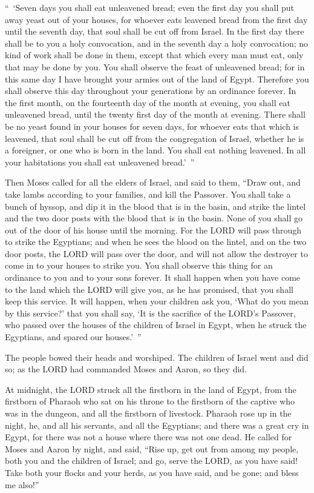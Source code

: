 \myverse{}“ ‘Seven days you shall eat unleavened bread; even the first
day you shall put away yeast out of your houses, for whoever eats leavened bread from the first day until
the seventh day, that soul shall be cut off from Israel.
\myverse{}In the first day there shall be to you a holy convocation, and in the seventh
day a holy convocation; no kind of work shall be done in them, except that which every man must eat, only
that may be done by you.
\myverse{}You shall observe the feast of unleavened bread; for in this same day I have
brought your armies out of the land of Egypt. Therefore you shall observe this day throughout your generations
by an ordinance forever.
\myverse{}In the first month, on the fourteenth day of the month at evening, you shall
eat unleavened bread, until the twenty first day of the month at evening.
\myverse{}There shall be no yeast found in your houses for seven days, for whoever
eats that which is leavened, that soul shall be cut off from the congregation of Israel, whether he is
a foreigner, or one who is born in the land.
\myverse{}You shall eat nothing leavened. In all your habitations you shall eat unleavened
bread.’ ”


\myverse{}Then Moses called for all the elders of Israel, and said to
them, “Draw out, and take lambs according to your families, and kill the Passover.
\myverse{}You shall take a bunch of hyssop, and dip it in the blood that is in the
basin, and strike the lintel and the two door posts with the blood that is in the basin. None of you shall
go out of the door of his house until the morning.
\myverse{}For the LORD will pass through to strike the Egyptians; and when he sees
the blood on the lintel, and on the two door posts, the LORD will pass over the door, and will not allow
the destroyer to come in to your houses to strike you.
\myverse{}You shall observe this thing for an ordinance to you and to your sons forever.
\myverse{}It shall happen when you have come to the land which the LORD will give you,
as he has promised, that you shall keep this service.
\myverse{}It will happen, when your children ask you, ‘What do you mean by this service?’
\myverse{}that you shall say, ‘It is the sacrifice of the LORD’s Passover, who passed
over the houses of the children of Israel in Egypt, when he struck the Egyptians, and spared our houses.’ ”

The people bowed their heads and worshiped. \myverse{}The children of Israel went and did so; as the LORD had commanded Moses and
Aaron, so they did.


\myverse{}At midnight, the LORD struck all the firstborn in the land of
Egypt, from the firstborn of Pharaoh who sat on his throne to the firstborn of the captive who was in
the dungeon, and all the firstborn of livestock.
\myverse{}Pharaoh rose up in the night, he, and all his servants, and all the Egyptians;
and there was a great cry in Egypt, for there was not a house where there was not one dead.
\myverse{}He called for Moses and Aaron by night, and said, “Rise up, get out from
among my people, both you and the children of Israel; and go, serve the LORD, as you have said!
\myverse{}Take both your flocks and your herds, as you have said, and be gone; and
bless me also!”


